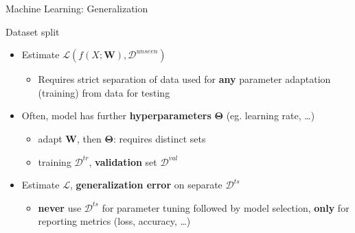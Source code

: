 \begin{frame}{Machine Learning: Generalization}
\protect\hypertarget{machine-learning-generalization-2}{}
\begin{block}{Dataset split}
\protect\hypertarget{dataset-split}{}
\begin{itemize}
\tightlist
\item
  Estimate \(\mathcal{L}(f(X;\mathbf{W}),\mathcal{D}^{unseen})\)

  \begin{itemize}
  \tightlist
  \item
    Requires strict separation of data used for \textbf{any} parameter
    adaptation (training) from data for testing
  \end{itemize}
\end{itemize}
\end{block}

\begin{itemize}
\tightlist
\item
  Often, model has further \textbf{hyperparameters}
  \(\boldsymbol{\Theta}\) (eg. learning rate, \ldots)

  \begin{itemize}
  \tightlist
  \item
    adapt \(\mathbf{W}\), then \(\boldsymbol{\Theta}\): requires
    distinct sets
  \item
    training \(\mathcal{D}^{tr}\), \textbf{validation} set
    \(\mathcal{D}^{val}\)
  \end{itemize}
\item
  Estimate \(\mathcal{L}\), \textbf{generalization error} on separate
  \(\mathcal{D}^{ts}\)

  \begin{itemize}
  \tightlist
  \item
    \textbf{never} use \(\mathcal{D}^{ts}\) for parameter tuning
    followed by model selection, \textbf{only} for reporting metrics
    (loss, accuracy, \ldots)
  \end{itemize}
\end{itemize}
\end{frame}

